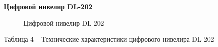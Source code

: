 \documentclass[a4paper]{article}
\begin{document}
\begin{newpage}
        
        \begin{center}
            \textbf{Цифровой нивелир DL-202}
        \end{center}
        
        \begin{figure}[h]
            \caption{Цифровой нивелир DL-202}
            \label{fig:image}
        \end{figure}
        
        \begin{center}
            \begin{flushleft}
                Таблица 4 – Технические характеристики цифрового нивелира DL-202
            \end{flushleft}
            

\end{center}
\end{newpage}
\end{document}
